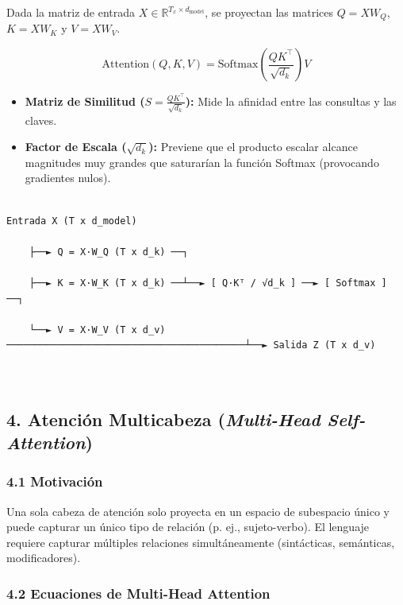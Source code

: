 \documentclass[11pt,oneside]{article}
\begin{document}
Dada la matriz de entrada \(X \in \mathbb{R}^{T_x \times d_{\text{model}}}\), se proyectan las matrices \(Q = X W_Q\), \(K = X W_K\) y \(V = X W_V\).

\[\text{Attention}(Q, K, V) = \text{Softmax}\left( \frac{Q K^\top}{\sqrt{d_k}} \right) V\]

\begin{itemize}

\item \textbf{Matriz de Similitud (\(S = \frac{Q K^\top}{\sqrt{d_k}}\)):} Mide la afinidad entre las consultas y las claves.

\end{itemize}

\begin{itemize}

\item \textbf{Factor de Escala (\(\sqrt{d_k}\)):} Previene que el producto escalar alcance magnitudes muy grandes que saturarían la función Softmax (provocando gradientes nulos).

\end{itemize}

\begin{lstlisting}

Entrada X (T x d_model)

    ├──► Q = X·W_Q (T x d_k) ──┐

    ├──► K = X·W_K (T x d_k) ──┴──► [ Q·Kᵀ / √d_k ] ──► [ Softmax ] ──┐

    └──► V = X·W_V (T x d_v) ──────────────────────────────────────────┴──► Salida Z (T x d_v)



\end{lstlisting}

\subsection{4. Atención Multicabeza (\emph{Multi-Head Self-Attention})}

\subsubsection{4.1 Motivación}

Una sola cabeza de atención solo proyecta en un espacio de subespacio único y puede capturar un único tipo de relación (p. ej., sujeto-verbo). El lenguaje requiere capturar múltiples relaciones simultáneamente (sintácticas, semánticas, modificadores).

\subsubsection{4.2 Ecuaciones de Multi-Head Attention}
\end{document}

